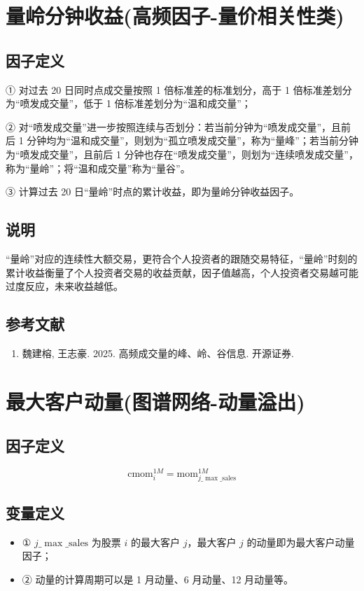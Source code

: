 \documentclass{article}
\begin{document}
\section{量岭分钟收益(高频因子-量价相关性类)}

\subsection{因子定义}

① 对过去 20 日同时点成交量按照 1 倍标准差的标准划分，高于 1 倍标准差划分为“喷发成交量”，低于 1 倍标准差划分为“温和成交量”；

② 对“喷发成交量”进一步按照连续与否划分：若当前分钟为“喷发成交量”，且前后 1 分钟均为“温和成交量”，则划为“孤立喷发成交量”，称为“量峰”；若当前分钟为“喷发成交量”，且前后 1 分钟也存在“喷发成交量”，则划为“连续喷发成交量”，称为“量岭”；将“温和成交量”称为“量谷”。

③ 计算过去 20 日“量岭”时点的累计收益，即为量岭分钟收益因子。

\subsection{说明}
“量岭”对应的连续性大额交易，更符合个人投资者的跟随交易特征，“量岭”时刻的累计收益衡量了个人投资者交易的收益贡献，因子值越高，个人投资者交易越可能过度反应，未来收益越低。

\subsection{参考文献}
\begin{enumerate}
    \item 魏建榕, 王志豪. 2025. 高频成交量的峰、岭、谷信息. 开源证券.
\end{enumerate}

\section{最大客户动量(图谱网络-动量溢出)}

\subsection{因子定义}
\begin{equation}
    \mathrm{cmom}_i^{1M} = \mathrm{mom}_{j\_{\max\_\mathrm{sales}}}^{1M}
\end{equation}

\subsection{变量定义}
\begin{itemize}
    \item ① \( j\_{\max\_\mathrm{sales}} \) 为股票 \( i \) 的最大客户 \( j \)，最大客户 \( j \) 的动量即为最大客户动量因子；
    \item ② 动量的计算周期可以是 1 月动量、6 月动量、12 月动量等。
\end{itemize}
\end{document}
